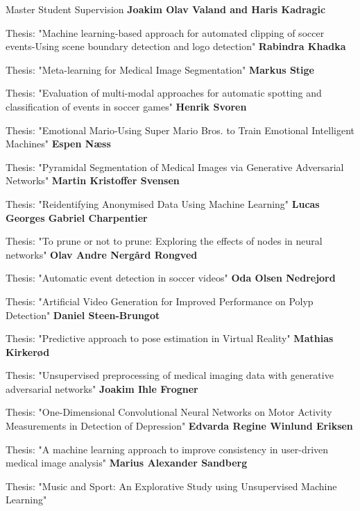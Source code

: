 \begin{rubric}{Master Student Supervision}
    \entry*[2021]%
    \textbf{Joakim Olav Valand and Haris Kadragic} \par
    Thesis: "Machine learning-based approach for automated clipping of soccer events-Using scene boundary detection and logo detection"
    \entry*[2021]%
    \textbf{Rabindra Khadka} \par
    Thesis: "Meta-learning for Medical Image Segmentation"
    \entry*[2021]%
    \textbf{Markus Stige} \par
    Thesis: "Evaluation of multi-modal approaches for automatic spotting and classification of events in soccer games"
    \entry*[2020]%
    \textbf{Henrik Svoren} \par
    Thesis: "Emotional Mario-Using Super Mario Bros. to Train Emotional Intelligent Machines"
    \entry*[2020]%
    \textbf{Espen Næss} \par
    Thesis: "Pyramidal Segmentation of Medical Images via Generative Adversarial Networks"
    \entry*[2020]%
    \textbf{Martin Kristoffer Svensen} \par
    Thesis: "Reidentifying Anonymised Data Using Machine Learning"
    \entry*[2020]%
    \textbf{Lucas Georges Gabriel Charpentier} \par
    Thesis: "To prune or not to prune: Exploring the effects of nodes in neural networks"
    \entry*[2020]%
    \textbf{Olav Andre Nergård Rongved} \par
    Thesis: "Automatic event detection in soccer videos"
    \entry*[2020]%
    \textbf{Oda Olsen Nedrejord} \par
    Thesis: "Artificial Video Generation for Improved Performance on Polyp Detection"
    \entry*[2020]%
    \textbf{Daniel Steen-Brungot} \par
    Thesis: "Predictive approach to pose estimation in Virtual Reality"
    \entry*[2019]%
    \textbf{Mathias Kirkerød} \par
    Thesis: "Unsupervised preprocessing of medical imaging data with generative adversarial networks"
    \entry*[2019]%
    \textbf{Joakim Ihle Frogner} \par
    Thesis: "One-Dimensional Convolutional Neural Networks on Motor Activity Measurements in Detection of Depression"
    \entry*[2019]%
    \textbf{Edvarda Regine Winlund Eriksen} \par
    Thesis: "A machine learning approach to improve consistency in user-driven medical image analysis"
    \entry*[2019]%
    \textbf{Marius Alexander Sandberg} \par
    Thesis: "Music and Sport: An Explorative Study using Unsupervised Machine Learning"
\end{rubric}